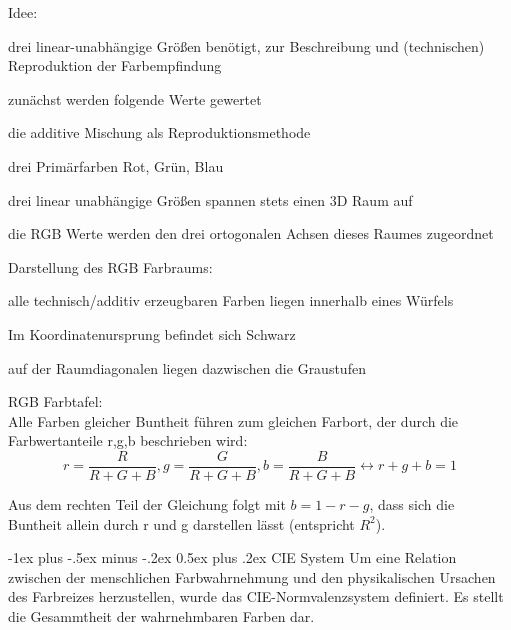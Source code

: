 \documentclass[landscape]{article}
\makeatletter
\renewcommand{\section}{\@startsection{section}{1}{0mm}%
                                {-1ex plus -.5ex minus -.2ex}%
                                {0.5ex plus .2ex}%
                                {\normalfont\large\bfseries}}
\makeatother
\begin{document}
\begin{multicols}{3}
  Idee:
  \begin{itemize*}
    \item drei linear-unabhängige Größen benötigt, zur Beschreibung und (technischen) Reproduktion der Farbempfindung
    \item zunächst werden folgende Werte gewertet
    \begin{itemize*}
      \item die additive Mischung als Reproduktionsmethode
      \item drei Primärfarben Rot, Grün, Blau
      \item drei linear unabhängige Größen spannen stets einen 3D Raum auf
    \end{itemize*}
    \item die RGB Werte werden den drei ortogonalen Achsen dieses Raumes zugeordnet
  \end{itemize*}
  
  Darstellung des RGB Farbraums:
  \begin{itemize*}
    \item alle technisch/additiv erzeugbaren Farben liegen innerhalb eines Würfels
    \item Im Koordinatenursprung befindet sich Schwarz
    \item auf der Raumdiagonalen liegen dazwischen die Graustufen
  \end{itemize*}
  
  RGB Farbtafel:\\
  Alle Farben gleicher Buntheit führen zum gleichen Farbort, der durch die Farbwertanteile r,g,b beschrieben wird:
  $$r=\frac{R}{R+G+B}, g=\frac{G}{R+G+B}, b=\frac{B}{R+G+B} \leftrightarrow r+g+b=1$$
  
  Aus dem rechten Teil der Gleichung folgt mit $b=1-r-g$, dass sich die Buntheit allein durch r und g darstellen lässt (entspricht $R^2$).  
  
  \section{CIE System}
  Um eine Relation zwischen der menschlichen Farbwahrnehmung und den physikalischen Ursachen des Farbreizes herzustellen, wurde das CIE-Normvalenzsystem definiert. Es stellt die Gesammtheit der wahrnehmbaren Farben dar.
  

\end{multicols}
\end{document}
